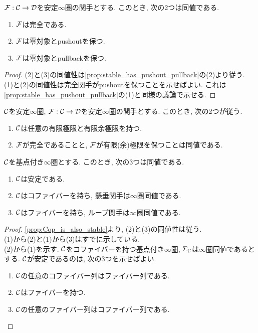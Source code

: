 \documentclass[uplatex, a4paper, 14Q, dvipdfmx]{jsarticle}
\begin{document}
\begin{lemma}
  $\mathcal{F} : \mathcal{C} \to \mathcal{D}$を安定$\infty$圏の関手とする. 
  このとき, 次の2つは同値である.
  \begin{enumerate}
    \item $\mathcal{F}$は完全である.
    \item $\mathcal{F}$は零対象とpushoutを保つ.
    \item $\mathcal{F}$は零対象とpullbackを保つ.
  \end{enumerate}
\end{lemma}

\begin{proof}
  (2)と(3)の同値性は\cref{prop:stable_has_pushout_pullback}の(2)より従う.\\
  (1)と(2)の同値性は完全関手がpushoutを保つことを示せばよい. 
  これは\cref{prop:stable_has_pushout_pullback}の(1)と同様の議論で示せる.
\end{proof}

\begin{theorem}
  $\mathcal{C}$を安定$\infty$圏, $\mathcal{F} : \mathcal{C} \to \mathcal{D}$を安定$\infty$圏の関手とする.
  このとき, 次の2つが従う. 
  \begin{enumerate}
    \item $\mathcal{C}$は任意の有限極限と有限余極限を持つ.
    \item $\mathcal{F}$が完全であることと, $\mathcal{F}$が有限(余)極限を保つことは同値である. 
  \end{enumerate}
\end{theorem}

\begin{prop}
  $\mathcal{C}$を基点付き$\infty$圏とする.
  このとき, 次の3つは同値である.
  \begin{enumerate}
    \item $\mathcal{C}$は安定である.
    \item $\mathcal{C}$はコファイバーを持ち, 懸垂関手は$\infty$圏同値である. 
    \item $\mathcal{C}$はファイバーを持ち, ループ関手は$\infty$圏同値である. 
  \end{enumerate}
\end{prop}

\begin{proof}
  \cref{prop:Cop_is_also_stable}より, (2)と(3)の同値性は従う. \\
  (1)から(2)と(1)から(3)はすでに示している.\\
  (2)から(1)を示す.
  $\mathcal{C}$をコファイバーを持つ基点付き$\infty$圏, $\Sigma_{\mathcal{C}}$は$\infty$圏同値であるとする.
  $\mathcal{C}$が安定であるのは, 次の3つを示せばよい. 
  \begin{enumerate}
    \item $\mathcal{C}$の任意のコファイバー列はファイバー列である. 
    \item $\mathcal{C}$はファイバーを持つ.
    \item $\mathcal{C}$の任意のファイバー列はコファイバー列である. 
  \end{enumerate}
  
\end{proof}
\end{document}
